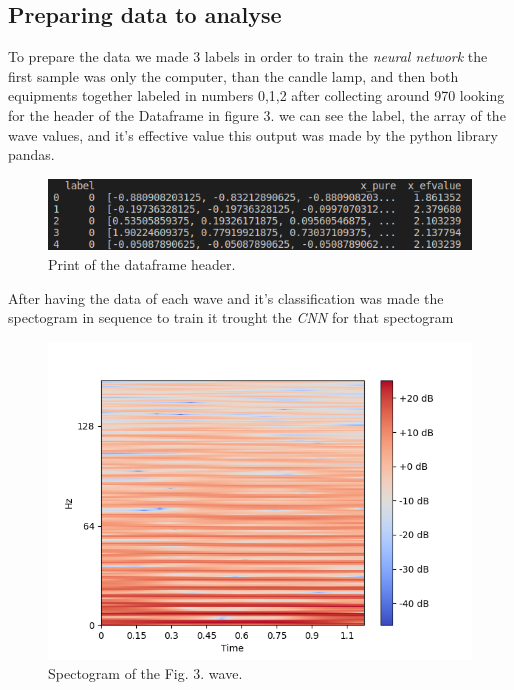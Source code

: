 \documentclass[conference]{IEEEtran}
\begin{document}
\subsection{Preparing data to analyse}
To prepare the data we made 3 labels in order to train the {\it neural network} the first sample was only the computer, than the candle lamp, and then both equipments together labeled in numbers 0,1,2 after collecting around 970 looking for the header of the Dataframe in figure 3. we can see the label, the array of the wave values, and it's effective value this output was made by the python library pandas.
\begin{figure}[htbp]
\centerline{\includegraphics[scale=0.4]{Datasetresume.png}}
\caption{Print of the dataframe header.}
\label{fig}
\end{figure}


After having the data of each wave and it's classification was made the spectogram in sequence to train it trought the {\it CNN} for that spectogram 


\begin{figure}[htbp]
\centerline{\includegraphics[scale=0.45]{lastwavespecgram.png}}
\caption{Spectogram of the Fig. 3. wave.}
\label{fig}
\end{figure}
\end{document}
